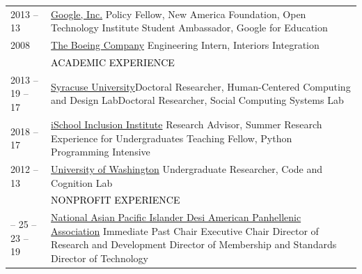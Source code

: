 \documentclass[12pt]{article}
\begin{document}
{\begin{longtable}{R{0.75in}p{5.0in}}
\footnotesize{\vfill 2013 \vspace{1mm}  -- 13 \hfill} & \href{https://www.google.com/policyfellowship/2013fellows.html}{Google, Inc.} \break Policy Fellow, New America Foundation, Open Technology Institute \break Student Ambassador, Google for Education\\

\footnotesize{\vfill 2008} & \href{https://www.engr.washington.edu/current/studentprogs/alva}{The Boeing Company} \break Engineering Intern, Interiors Integration \medskip \\ 

& \large \textcolor{black}{\uppercase{Academic Experience}}\\

\footnotesize{\vfill 2013 -- 19 \vspace{1mm}  -- 17 \hfill} & \href{https://ischool.syr.edu/research/human-centered-computing-and-design-lab/}{Syracuse University}\break Doctoral Researcher, Human-Centered Computing and Design Lab\break Doctoral Researcher, Social Computing Systems Lab\\

\footnotesize{\vfill 2018 -- 17 \vspace{1mm}  \hfill} & \href{https://www.sis.pitt.edu/i3/phd-fellows/fellow-profiles.html}{iSchool Inclusion Institute} \break Research Advisor, Summer Research Experience for Undergraduates \break Teaching Fellow, Python Programming Intensive\\

\footnotesize{\vfill 2012 -- 13 \hfill} & \href{https://faculty.washington.edu/ajko/lab}{University of Washington} \break Undergraduate Researcher, Code and Cognition Lab \medskip \\ \pagebreak

& \large \textcolor{black}{\uppercase{Nonprofit Experience}}\\

\footnotesize{\vspace{0mm}  \vspace{1mm}  -- 25 \vspace{1mm}  -- 23 \vspace{1mm}  -- 19 \vspace{1mm}  \hfill} & \href{https://www.napahq.org/}{National Asian Pacific Islander Desi American Panhellenic Association} \break Immediate Past Chair \break Executive Chair \break Director of Research and Development \break Director of Membership and Standards \break Director of Technology\\


\end{longtable}}
\end{document}
